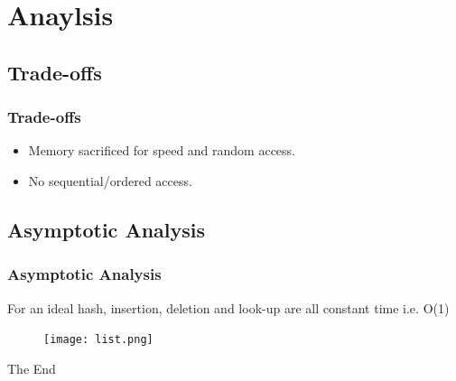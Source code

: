 \documentclass{beamer}
\begin{document}
\section{Anaylsis}
\subsection{Trade-offs}
\begin{frame}
\frametitle{Trade-offs}
\begin{itemize}
  \item Memory sacrificed for speed and random access.
  \item No sequential/ordered access.
\end{itemize}
\end{frame}





  \subsection{Asymptotic Analysis}
\begin{frame}
\frametitle{Asymptotic Analysis}
For an ideal hash, insertion, deletion and look-up are all constant time i.e. O(1)
\begin{figure}
\texttt{[image: list.png]}
\end{figure}


\end{frame}



\begin{frame}
\Huge{\centerline{The End}}
\end{frame}

\end{document}
